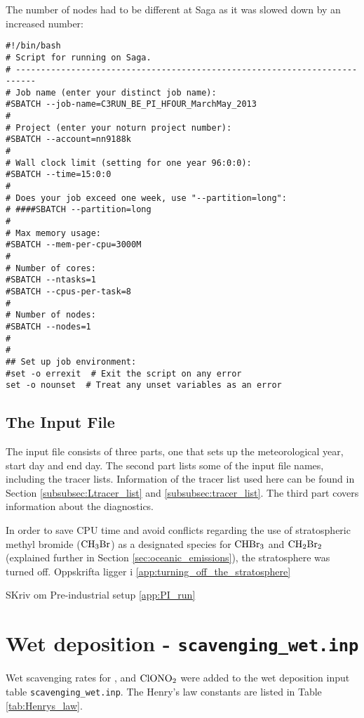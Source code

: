 The number of nodes had to be different at Saga as it was slowed down by an increased number: 

\begin{lstlisting}
#!/bin/bash
# Script for running on Saga.
# --------------------------------------------------------------------------
# Job name (enter your distinct job name):
#SBATCH --job-name=C3RUN_BE_PI_HFOUR_MarchMay_2013
#
# Project (enter your noturn project number):
#SBATCH --account=nn9188k
#
# Wall clock limit (setting for one year 96:0:0):
#SBATCH --time=15:0:0
#
# Does your job exceed one week, use "--partition=long":
# ####SBATCH --partition=long
#
# Max memory usage:
#SBATCH --mem-per-cpu=3000M
#
# Number of cores:
#SBATCH --ntasks=1
#SBATCH --cpus-per-task=8
#
# Number of nodes:
#SBATCH --nodes=1
#
#
## Set up job environment:
#set -o errexit  # Exit the script on any error
set -o nounset  # Treat any unset variables as an error
\end{lstlisting}


\subsection{The Input File}

The input file consists of three parts, one that sets up the meteorological year, start day and end day. The second part lists some of the input file names, including the tracer lists. Information of the tracer list used here can be found in Section \ref{subsubsec:Ltracer_list} and \ref{subsubsec:tracer_list}. The third part covers information about the diagnostics. 

In order to save CPU time and avoid conflicts regarding the use of stratospheric methyl bromide ($\mathrm{CH_3Br}$) as a designated species for $\mathrm{CHBr_3}$ and $\mathrm{CH_2Br_2}$ (explained further in Section \ref{sec:oceanic_emissions}), the stratosphere was turned off. Oppskrifta ligger i \ref{app:turning_off_the_stratosphere}

SKriv om Pre-industrial setup \ref{app:PI_run}


\section{Wet deposition - \texttt{scavenging\_wet.inp}}\label{sec:scav_wet}

Wet scavenging rates for ,  and $\mathrm{ClONO_2}$ were added to the wet deposition input table \texttt{scavenging\_wet.inp}. The Henry's law constants are listed in Table \ref{tab:Henrys_law}. 

